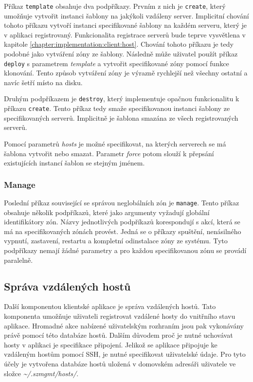 Příkaz \verb|template| obsahuje dva podpříkazy. Prvním z nich je \verb|create|, který umožňuje vytvořit instanci šablony na 
jakýkoli vzdáleny server. Implicitní chování tohoto příkazu vytvoří instanci specifikované šablony na každém serveru, který
je v aplikaci registrovaný. Funkcionalita registrace serverů bude teprve vysvětlena v kapitole \ref{chapter:implementation:client:host}.
Chování tohoto příkazu je tedy podobné jako vytváření zóny ze šablony. Následně může uživatel použít příkaz \verb|deploy|
s parametrem \textit{template} a vytvořit specifikované zóny pomocí funkce klonování. Tento způsob vytváření zóny je výrazně
rychlejší než všechny ostatní a navíc šetří místo na disku.

Druhým podpříkazem je \verb|destroy|, který implementuje opačnou funkcionalitu k příkazu \verb|create|. Tento příkaz tedy 
smaže specifikovanou instanci šablony ze specifikovaných serverů. Implicitně je šablona smazána ze všech registrovaných serverů.

Pomocí parametrů \textit{hosts} je možné specifikovat, na kterých serverech se má šablona vytvořit nebo smazat. Parametr
\textit{force} potom slouží k přepsání existujících instancí šablon se stejným jménem.
\subsubsection{Manage}
\label{chapter:implementation:client:cli:manage}
Poslední příkaz související se správou neglobálních zón je \verb|manage|. Tento příkaz obsahuje několik podpříkazů, které
jako argumenty vyžadují globální identifikátory zón. Názvy jednotlivých podpříkazů korespondují s akcí, která se má na specifikovaných
zónách provést. Jedná se o příkazy spuštění, nenásilného vypnutí, zastavení, restartu a kompletní odinstalace zóny ze systému.
Tyto podpříkazy nemají žádné parametry a pro každou specifikovanou zónu se provádí paralelně.
\subsection{Správa vzdálených hostů}
\label{chapter:implementation:client:hosts}
Další komponentou klientské aplikace je správa vzdálených hostů. Tato komponenta umožňuje uživateli registrovat vzdálené 
hosty do vnitřního stavu aplikace. Hromadné akce nabízené uživatelským rozhraním jsou pak vykonávány právě pomocí této databáze
hostů. Dalším důvodem proč je nutné uchovávat hosty v aplikaci je specifikace připojení. Jelikož se aplikace připojuje ke
vzdáleným hostům pomocí SSH, je nutné specifikovat uživatelské údaje. Pro tyto účely je vytvořena databáze hostů uložená
v domovském adresáři uživatele ve složce \textit{\textasciitilde/.szmgmt/hosts/}.

